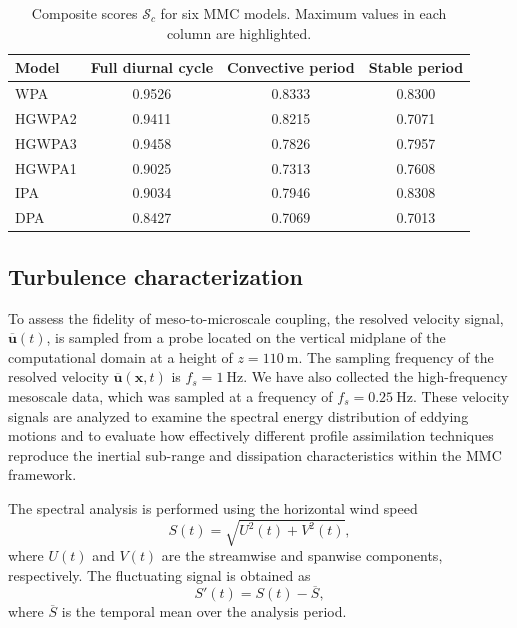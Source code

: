 \begin{table}[htbp]
\centering
\caption{Composite scores $\mathcal{S}_c$ for six MMC models. Maximum values in each column are highlighted.}
\label{tab:finalscore}
\begin{tabular}{lccc}
\toprule
Model & Full diurnal cycle & Convective period & Stable period\\
\midrule
WPA & \cellcolor{gray!30}0.9526 & \cellcolor{gray!30}0.8333 & 0.8300\\
HGWPA2 & 0.9411 & 0.8215 & 0.7071\\
HGWPA3 & 0.9458 & 0.7826 & 0.7957\\
HGWPA1 & 0.9025 & 0.7313 & 0.7608\\
IPA & 0.9034 & 0.7946 & \cellcolor{gray!30}0.8308\\
DPA & 0.8427 & 0.7069 & 0.7013\\
\bottomrule
\end{tabular}
\end{table}

\subsection{\textbf{Turbulence characterization}}
To assess the fidelity of meso-to-microscale coupling, the resolved velocity signal, $\overline{\bm{u}}(t)$, is sampled from a probe located on the vertical midplane of the computational domain at a height of $z = 110~\mathrm{m}$. The sampling frequency of the resolved velocity $\overline{\bm{u}}(\bm x, t)$ is $f_s = 1~\mathrm{Hz}$. We have also collected the high-frequency mesoscale data, which was sampled at a frequency of $f_s = 0.25~\mathrm{Hz}$. These velocity signals are analyzed to examine the spectral energy distribution of eddying motions and to evaluate how effectively different profile assimilation techniques reproduce the inertial sub-range and dissipation characteristics within the MMC framework. 

The spectral analysis is performed using the horizontal wind speed
\begin{equation}
S(t) = \sqrt{U^2(t) + V^2(t)},
\end{equation}
where $U(t)$ and $V(t)$ are the streamwise and spanwise components, respectively. The fluctuating signal is obtained as
\begin{equation}
S'(t) = S(t) - \overline{S},
\end{equation}
where $\overline{S}$ is the temporal mean over the analysis period.

